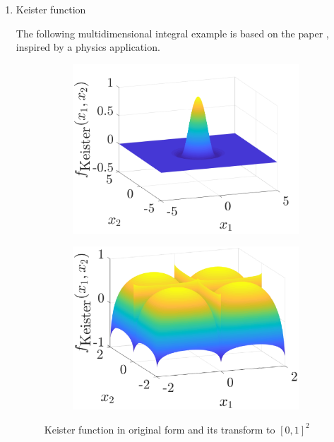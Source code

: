\documentclass[smallextended]{svjour3}       %
\begin{document}
\begin{enumerate}
\item Keister function

The following multidimensional integral example is based on the paper \cite{KeisterExample}, inspired by a physics application.


\begin{figure}[H]
\linespread{0.7}
\centering
\captionsetup[subfigure]{labelformat=empty}
\begin{subfigure}[b]{0.48\textwidth}
\includegraphics[width=\textwidth]{Keister_wholeR}
\end{subfigure}
\centering
\captionsetup[subfigure]{labelformat=empty}
\begin{subfigure}[b]{0.48\textwidth}
\includegraphics[width=\textwidth]{Keister_cube}
\end{subfigure}
\caption{Keister function in original form and its transform to $[0,1]^2$}
\label{fig:Keister}
\end{figure}



\end{enumerate}
\end{document}
